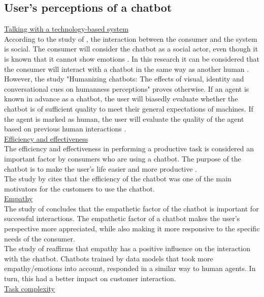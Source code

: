 \subsection{User’s perceptions of a chatbot}
\ul{Talking with a technology-based system}\\
According to the study of \citeauthor{Adam2021}, the interaction between the consumer and the system is social. The consumer will consider the chatbot as a social actor, even though it is known that it cannot show emotions \citep{Adam2021}. In this research it can be considered that the consumer will interact with a chatbot in the same way as another human \citep*{Cheng2021,Ischen2020}.\\
However, the study "Humanizing chatbots: The effects of visual, identity and conversational cues on humanness perceptions" proves otherwise. If an agent is known in advance as a chatbot, the user will biasedly evaluate whether the chatbot is of sufficient quality to meet their general expectations of machines. If the agent is marked as human, the user will evaluate the quality of the agent based on previous human interactions \citep*{Go2019,Shyam2008}.\\
\break
\ul{Efficiency and effectiveness}\\
The efficiency and effectiveness in performing a productive task is considered an important factor by consumers who are using a chatbot. The purpose of the chatbot is to make the user's life easier and more productive \citep{Brandtzaeg2018}.\\
The study by \citeauthor{Skjuve2019} cites that the efficiency of the chatbot was one of the main motivators for the customers to use the chatbot.\citep{Skjuve2019}\\
\break
\ul{Empathy}\\
The study of \citeauthor{Cheng2021} concludes that the empathetic factor of the chatbot is important for successful interactions. The empathetic factor of a chatbot makes the user's perspective more appreciated, while also making it more responsive to the specific needs of the consumer.\\
The study of \citeauthor{Agarwal2021} reaffirms that empathy has a positive influence on the interaction with the chatbot. Chatbots trained by data models that took more empathy/emotions into account, responded in a similar way to human agents. In turn, this had a better impact on customer interaction. \citep{Agarwal2021}\\
\break
\ul{Task complexity}\\
